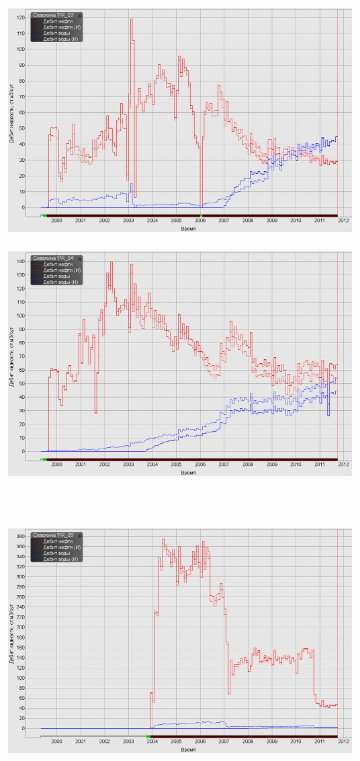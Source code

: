\documentclass[a4paper,12pt]{article}
\begin{document}
\begin{figure}[H]
\begin{subfigure}[t]{\dimexpr.5\linewidth-1.3em\relax}
	\end{subfigure}
\\[20pt]
\begin{subfigure}[t]{\dimexpr.5\linewidth-1.3em\relax}
	\centering
	\includegraphics[width=.95\linewidth]{aw3}
\end{subfigure}%
\hfill %
%
\begin{subfigure}[t]{\dimexpr.5\linewidth-1.3em\relax}
	\centering
	\includegraphics[width=.95\linewidth]{aw4}
\end{subfigure}
\\[20pt]
	\begin{subfigure}[t]{\dimexpr.5\linewidth-1.3em\relax}
		\centering
		\includegraphics[width=.95\linewidth]{aw5}

\end{subfigure}
\end{figure}
\end{document}

